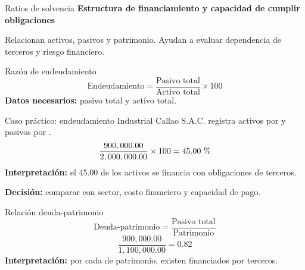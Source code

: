 \begin{frame}{Ratios de solvencia}
\color{solvencia}\textbf{Estructura de financiamiento y capacidad de cumplir obligaciones}\color{black}

\vspace{0.7em}
Relacionan activos, pasivos y patrimonio. Ayudan a evaluar dependencia de terceros y riesgo financiero.
\end{frame}

\begin{frame}{Razón de endeudamiento}
\[
\text{Endeudamiento}=\frac{\text{Pasivo total}}{\text{Activo total}}\times 100
\]
\textbf{Datos necesarios:} pasivo total y activo total.
\end{frame}

\begin{frame}{Caso práctico: endeudamiento}
\casoeducativo
Industrial Callao S.A.C. registra activos por  y pasivos por .
\[
\frac{900,000.00}{2,000,000.00}\times 100=45.00\text{ \char37}
\]
\textbf{Interpretación:} el 45.00  de los activos se financia con obligaciones de terceros.

\textbf{Decisión:} comparar con sector, costo financiero y capacidad de pago.
\end{frame}

\begin{frame}{Relación deuda-patrimonio}
\[
\text{Deuda-patrimonio}=\frac{\text{Pasivo total}}{\text{Patrimonio}}
\]
\[
\frac{900,000.00}{1,100,000.00}=0.82
\]
\textbf{Interpretación:} por cada  de patrimonio, existen  financiados por terceros.
\end{frame}
